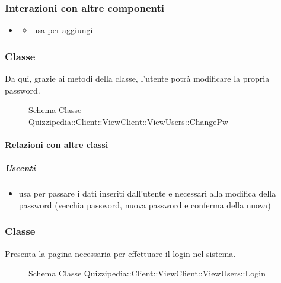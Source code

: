\subsubsection{Interazioni con altre componenti}
\begin{itemize}
\item {}
\begin{itemize}
\item usa  per aggiungi
\end{itemize}
\end{itemize}
\subsubsection{Classe }
Da qui, grazie ai metodi della classe, l'utente potrà modificare la propria password.
\begin{figure}[H]
\centering
\noindent{}
\caption[Schema Classe ChangePw]{Schema Classe Quizzipedia::Client::ViewClient::ViewUsers::ChangePw}
\end{figure}
\paragraph{Relazioni con altre classi}
\subparagraph{Uscenti}
\begin{itemize}
\item usa  per passare i dati inseriti dall'utente e necessari alla modifica della password (vecchia password, nuova password e conferma della nuova)
\end{itemize}
\subsubsection{Classe }
Presenta la pagina necessaria per effettuare il login nel sistema.
\begin{figure}[H]
\centering
\noindent{}
\caption[Schema Classe Login]{Schema Classe Quizzipedia::Client::ViewClient::ViewUsers::Login}
\end{figure}
